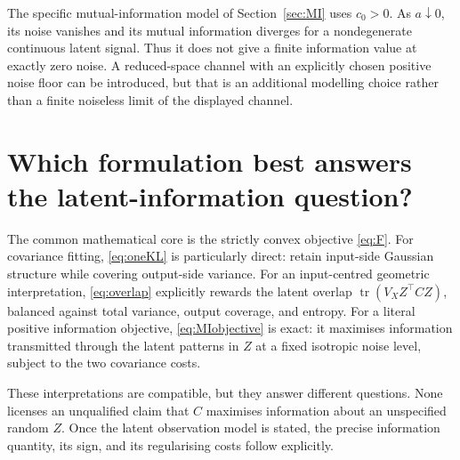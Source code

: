 \documentclass[11pt,a4paper]{article}
\newcommand{\tr}{\operatorname{tr}}
\begin{document}
The specific mutual-information model of Section~\ref{sec:MI} uses
$c_0>0$. As $a\downarrow0$, its noise vanishes and its mutual information
diverges for a nondegenerate continuous latent signal. Thus it does not
give a finite information value at exactly zero noise. A reduced-space
channel with an explicitly chosen positive noise floor can be introduced,
but that is an additional modelling choice rather than a finite noiseless
limit of the displayed channel.

\section{Which formulation best answers the latent-information question?}
The common mathematical core is the strictly convex objective
\eqref{eq:F}. For covariance fitting, \eqref{eq:oneKL} is particularly
direct: retain input-side Gaussian structure while covering output-side
variance. For an input-centred geometric interpretation,
\eqref{eq:overlap} explicitly rewards the latent overlap
$\tr(V_XZ^\top CZ)$, balanced against total variance, output coverage,
and entropy. For a literal positive information objective,
\eqref{eq:MIobjective} is exact: it maximises information transmitted
through the latent patterns in $Z$ at a fixed isotropic noise level,
subject to the two covariance costs.

These interpretations are compatible, but they answer different questions.
None licenses an unqualified claim that $C$ maximises information about
an unspecified random $Z$. Once the latent observation model is stated,
the precise information quantity, its sign, and its regularising costs
follow explicitly.
\end{document}
